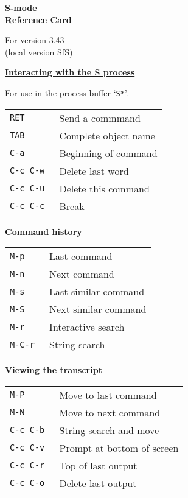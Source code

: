 
\raggedbottom
\pagestyle{empty}



\twocolumn

\begin{center}
{\Large\bf
  S-mode\\
Reference
Card\\
}

{\large For version 3.43\\(local version SfS)}
\end{center}

\vspace{1.5cm}
  
\underline{\large\bf Interacting with the S process}

For use in the process buffer `{\tt *S*}'.

\begin{tabular}{p{1.5cm}l}
{\tt RET   }& Send a commmand \\
{\tt TAB   }& Complete object name \\
{\tt C-a   }& Beginning of command \\
{\tt C-c C-w }& Delete last word \\
{\tt C-c C-u }& Delete this command \\
{\tt C-c C-c }& Break  
\end{tabular}

\underline{\bf Command history}\\
\begin{tabular}{p{1.5cm}l}
{\tt M-p   }& Last command \\
{\tt M-n   }& Next command \\
{\tt M-s   }& Last similar command \\
{\tt M-S   }& Next similar command \\
{\tt M-r   }& Interactive search \\
{\tt M-C-r   }& String search
\end{tabular}

\underline{\bf Viewing the transcript}\\
\begin{tabular}{p{1.5cm}l}
{\tt M-P   }& Move to last command \\
{\tt M-N   }& Move to next command \\
{\tt C-c C-b }& String search and move \\
{\tt C-c C-v }& Prompt at bottom of screen \\
{\tt C-c C-r }& Top of last output \\
{\tt C-c C-o }& Delete last output 
\end{tabular}

